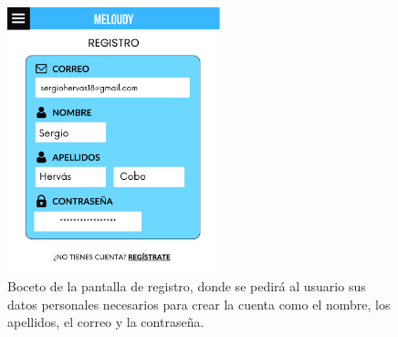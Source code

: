 \begin{figure}[H]
    \centering
    \centerline{\includegraphics[width=0.55\textwidth, frame]{imagenes/c6/10.png}}
    \caption{Boceto de la pantalla de registro, donde se pedirá al usuario sus datos personales necesarios para crear la cuenta como el nombre, los apellidos, el correo y la contraseña.}
    \label{fig:registro}
\end{figure}